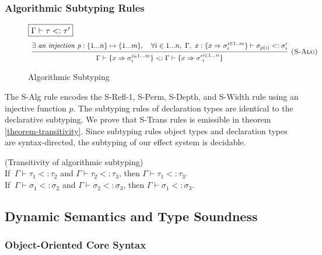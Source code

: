 \subsubsection{Algorithmic Subtyping Rules}
\begin{figure}[H]
\flushleft
\footnotesize{
$\fbox{$\Gamma \vdash \tau <: \tau'$}$
\[
\begin{array}{c}

  

\infer[\textsc{(S-Alg)}]
  {\Gamma \vdash \{ x \Rightarrow \sigma_i^{i\in1\dots m}\} <: \Gamma \vdash \{ x \Rightarrow {\sigma'}_i^{i\in1\dots n}\}}
  {\exists\ \mathit{an~injection~p}: \{1...n\} \mapsto \{1...m\},\quad \forall i\in 1...n, ~\Gamma,~x : \{ x \Rightarrow {\sigma}_i^{i \in 1..m} \} \vdash \sigma_{p(i)}<: \sigma_i'}

\end{array}
\]

}
\caption{Algorithmic Subtyping}
\end{figure}

The S-Alg rule encodes the S-Refl-1, S-Perm, S-Depth, and S-Width rule using an injective function $p$. The subtyping rules of declaration types are identical to the declarative subtyping. We prove that S-Trans rules is emissible in theorem \ref{theorem-transitivity}. 
Since subtyping rules object types and declaration types are syntax-directed, the subtyping of our effect system is decidable.

\begin{theorem} (Transitivity of algorithmic subtyping)\\
If $\ \Gamma \vdash \tau_1 <: \tau_2$ and $\Gamma \vdash \tau_2 <: \tau_3$, then $\Gamma \vdash \tau_1 <: \tau_3$. \\
If $\ \Gamma \vdash \sigma_1 <: \sigma_2$ and $\Gamma \vdash \sigma_2 <: \sigma_3$, then $\Gamma \vdash \sigma_1 <: \sigma_3$. 
\label{theorem-transitivity}
\end{theorem}


\subsection{Dynamic Semantics and Type Soundness}


\subsubsection{Object-Oriented Core Syntax}

